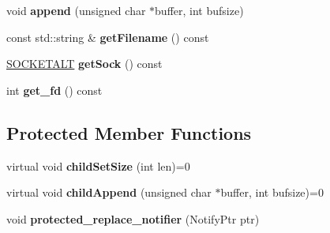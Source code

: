 \begin{DoxyCompactItemize}
\item 
void {\bfseries append} (unsigned char $\ast$buffer, int bufsize)\hypertarget{classVsnetDownload_1_1Client_1_1Item_afcde01036825874184093dd85d5a2e47}{}\label{classVsnetDownload_1_1Client_1_1Item_afcde01036825874184093dd85d5a2e47}

\item 
const std\+::string \& {\bfseries get\+Filename} () const \hypertarget{classVsnetDownload_1_1Client_1_1Item_a37390e0b5f743215dbffb8fac0083eb2}{}\label{classVsnetDownload_1_1Client_1_1Item_a37390e0b5f743215dbffb8fac0083eb2}

\item 
\hyperlink{classSOCKETALT}{S\+O\+C\+K\+E\+T\+A\+LT} {\bfseries get\+Sock} () const \hypertarget{classVsnetDownload_1_1Client_1_1Item_a8d113e9870e8d93ccba4c7e55607ac21}{}\label{classVsnetDownload_1_1Client_1_1Item_a8d113e9870e8d93ccba4c7e55607ac21}

\item 
int {\bfseries get\+\_\+fd} () const \hypertarget{classVsnetDownload_1_1Client_1_1Item_a652beeeb06feb512418d14e795e8d442}{}\label{classVsnetDownload_1_1Client_1_1Item_a652beeeb06feb512418d14e795e8d442}

\end{DoxyCompactItemize}
\subsection*{Protected Member Functions}
\begin{DoxyCompactItemize}
\item 
virtual void {\bfseries child\+Set\+Size} (int len)=0\hypertarget{classVsnetDownload_1_1Client_1_1Item_a7c2cdfee537d5be95a60ed1bbd667f45}{}\label{classVsnetDownload_1_1Client_1_1Item_a7c2cdfee537d5be95a60ed1bbd667f45}

\item 
virtual void {\bfseries child\+Append} (unsigned char $\ast$buffer, int bufsize)=0\hypertarget{classVsnetDownload_1_1Client_1_1Item_af645a6f1c62857efa877ef3e620d80f4}{}\label{classVsnetDownload_1_1Client_1_1Item_af645a6f1c62857efa877ef3e620d80f4}

\item 
void {\bfseries protected\+\_\+replace\+\_\+notifier} (Notify\+Ptr ptr)\hypertarget{classVsnetDownload_1_1Client_1_1Item_a5dc6b6059cc75ba8260b2edf6723e198}{}\label{classVsnetDownload_1_1Client_1_1Item_a5dc6b6059cc75ba8260b2edf6723e198}

\end{DoxyCompactItemize}
